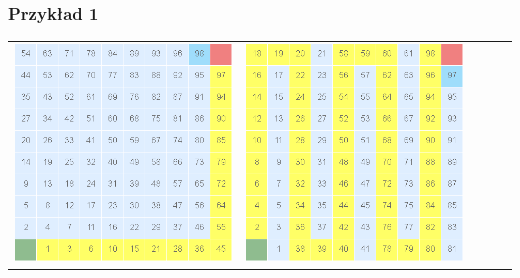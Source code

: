 \documentclass{article}
\begin{document}
\subsubsection{Przykład 1}
\begin{center}
\begin{tabular}{c c c c c}
\includegraphics[scale=0.15]{images/scr.png} &
\includegraphics[scale=0.15]{images/scr1.png} &

\end{tabular}
\end{center}
\end{document}
